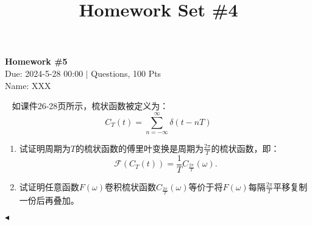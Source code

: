 \documentclass[11pt]{article}
\title{Homework Set \#4}
\newenvironment{question}[2][Question]{\begin{trivlist}
\item[\hskip \labelsep {\bfseries #1}\hskip \labelsep {\bfseries #2.}]}{\hfill$\blacktriangleleft$\end{trivlist}}
\begin{document}
    \pagestyle{fancy}
    \lhead{}
    \chead{}

    \begin{center}
        {\LARGE \bf Homework \#5}\\
        {Due: 2024-5-28 00:00 \quad$|$ Questions, 100 Pts}\\
        {Name: XXX}
    \end{center}

    \begin{question}{1 (100') (梳状函数)}~
    如课件26-28页所示，梳状函数被定义为：
    \begin{equation*}
        C_T(t) = \sum_{n=-\infty}^{\infty}\delta(t-nT)
    \end{equation*}
    \begin{enumerate}
        \item 试证明周期为$T$的梳状函数的傅里叶变换是周期为$\frac{2\pi}{T}$的梳状函数，即：
    \begin{equation*}
        \mathcal{F}(C_T(t)) = \frac{1}{T}C_{\frac{2\pi}{T}}(\omega).
    \end{equation*}
    \item 试证明任意函数$F(\omega)$卷积梳状函数$C_{\frac{2\pi}{T}}(\omega)$等价于将$F(\omega)$每隔$\frac{2\pi}{T}$平移复制一份后再叠加。

    \end{enumerate} 
    
    \end{question}
\end{document}
